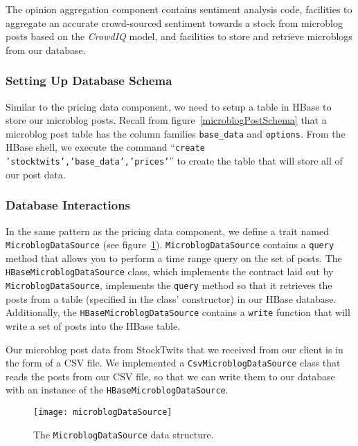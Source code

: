 The opinion aggregation component contains sentiment analysis code, facilities to aggregate an accurate crowd-sourced sentiment towards a stock from microblog posts based on the \textit{CrowdIQ} model, and facilities to store and retrieve microblogs from our database.

\subsubsection{Setting Up Database Schema}

Similar to the pricing data component, we need to setup a table in HBase to store our microblog posts. Recall from figure~\ref{microblogPostSchema} that a microblog post table has the column families \texttt{base\_data} and \texttt{options}. From the HBase shell, we execute the command ``\texttt{create 'stocktwits','base\_data','prices'}'' to create the table that will store all of our post data.

\subsubsection{Database Interactions}

In the same pattern as the pricing data component, we define a trait named \texttt{MicroblogDataSource} (see figure~\ref{microblogDataSource}). \texttt{MicroblogDataSource} contains a \texttt{query} method that allows you to perform a time range query on the set of posts. The \texttt{HBaseMicroblogDataSource} class, which implements the contract laid out by \texttt{MicroblogDataSource}, implements the \texttt{query} method so that it retrieves the posts from a table (specified in the class' constructor) in our HBase database. Additionally, the \texttt{HBaseMicroblogDataSource} contains a \texttt{write} function that will write a set of posts into the HBase table.

Our microblog post data from StockTwits that we received from our client is in the form of a CSV file. We implemented a \texttt{CsvMicroblogDataSource} class that reads the posts from our CSV file, so that we can write them to our database with an instance of the \texttt{HBaseMicroblogDataSource}.

\begin{figure}[h]
  \label{microblogDataSource}
  \begin{center}
    \texttt{[image: microblogDataSource]}
  \end{center}
  \caption{The \texttt{MicroblogDataSource} data structure.}
\end{figure}

